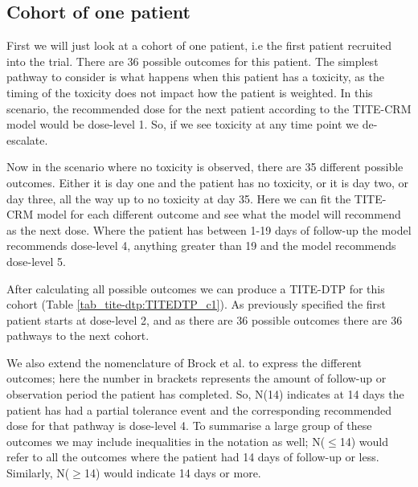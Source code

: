 
\subsection{Cohort of one patient}
\label{tite-dtp:TITE-DTPs-c1}

First we will just look at a cohort of one patient, i.e the first patient recruited into the trial. There are 36 possible outcomes for this patient. The simplest pathway to consider is what happens when this patient has a toxicity, as the timing of the toxicity does not impact how the patient is weighted. In this scenario, the recommended dose for the next patient according to the TITE-CRM model would be dose-level 1. So, if we see toxicity at any time point we de-escalate.   

Now in the scenario where no toxicity is observed, there are 35 different possible outcomes. Either it is day one and the patient has no toxicity, or it is day two, or day three, all the way up to no toxicity at day 35. Here we can fit the TITE-CRM model for each different outcome and see what the model will recommend as the next dose. Where the patient has between 1-19 days of follow-up the model recommends dose-level 4, anything greater than 19 and the model recommends dose-level 5.  

After calculating all possible outcomes we can produce a TITE-DTP for this cohort (Table \ref{tab_tite-dtp:TITEDTP_c1}). As previously specified the first patient starts at dose-level 2, and as there are 36 possible outcomes there are 36 pathways to the next cohort.

We also extend the nomenclature of Brock et al. \cite{brockImplementingEffToxDosefinding2017} to express the different outcomes; here the number in brackets represents the amount of follow-up or observation period the patient has completed. So,  N(14) indicates at 14 days the patient has had a partial tolerance event and the corresponding recommended dose for that pathway is dose-level 4. To summarise a large group of these outcomes we may include inequalities in the notation as well; N($\leq$14) would refer to all the outcomes where the patient had 14 days of follow-up or less. Similarly, N($\geq$14) would indicate 14 days or more. 

